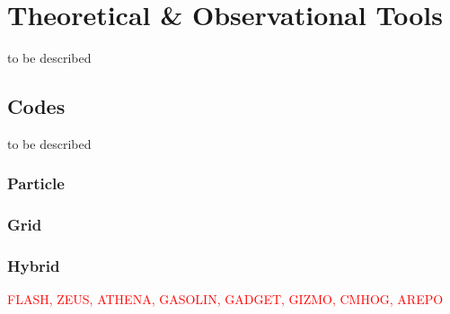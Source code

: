 \section{Theoretical \& Observational Tools}
to be described
\subsection{Codes}
to be described
\subsubsection{Particle}
\subsubsection{Grid}
\subsubsection{Hybrid}
\textcolor{red}{FLASH, ZEUS, ATHENA, GASOLIN, GADGET, GIZMO, CMHOG, AREPO}

\bigskip
\clearpage

%
%
